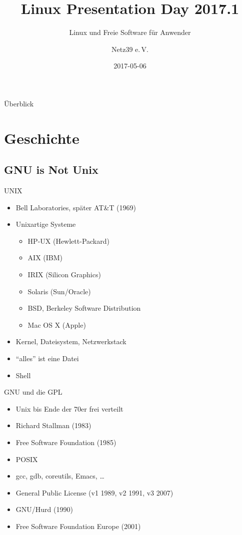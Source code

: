 \documentclass{beamer}
\title{Linux Presentation Day 2017.1}
\subtitle{Linux und Freie Software für Anwender}
\author{Netz39 e.\,V.}
\institute{\url{http://www.netz39.de/}}
\date{2017-05-06}
\begin{document}
\begin{frame}
	\titlepage
\end{frame}

\logo{
    
}

\begin{frame}{Überblick}
    \tableofcontents
\end{frame}

\section{Geschichte}

\subsection{GNU is Not Unix}

\begin{frame}{UNIX}
    \begin{itemize}
        \item Bell Laboratories, später AT\&T (1969)
        \item Unixartige Systeme
            \begin{itemize}
                \item HP-UX (Hewlett-Packard)
                \item AIX (IBM)
                \item IRIX (Silicon Graphics)
                \item Solaris (Sun/Oracle)
                \item BSD, Berkeley Software Distribution
                \item Mac OS X (Apple)
            \end{itemize}
        \item Kernel, Dateisystem, Netzwerkstack
        \item \enquote{alles} ist eine Datei
        \item Shell
    \end{itemize}
\end{frame}

\begin{frame}{GNU und die GPL}
    \begin{itemize}
        \item Unix bis Ende der 70er frei verteilt
        \item Richard Stallman (1983)
        \item Free Software Foundation (1985)
        \item POSIX
        \item gcc, gdb, coreutils, Emacs, …
        \item General Public License (v1 1989, v2 1991, v3 2007)
        \item GNU/Hurd (1990)
        \item Free Software Foundation Europe (2001)
    \end{itemize}
\end{frame}
\end{document}
